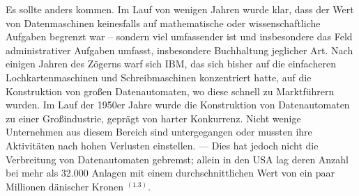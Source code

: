 {Es sollte anders kommen. Im Lauf von wenigen Jahren wurde klar, dass der Wert von Datenmaschinen keinesfalls auf mathematische oder wissenschaftliche Aufgaben begrenzt war -- sondern viel umfassender ist und insbesondere das Feld administrativer Aufgaben umfasst, insbesondere Buchhaltung jeglicher Art. Nach einigen Jahren des Zögerns warf sich IBM, das sich bisher auf die einfacheren Lochkartenmaschinen und Schreibmaschinen konzentriert hatte, auf die Konstruktion von großen Datenautomaten, wo diese schnell zu Marktführern wurden. Im Lauf der 1950er Jahre wurde die Konstruktion von Datenautomaten zu einer Großindustrie, geprägt von harter Konkurrenz. Nicht wenige Unternehmen aus diesem Bereich sind untergegangen oder mussten ihre Aktivitäten nach hohen Verlusten einstellen. — Dies hat jedoch nicht die Verbreitung von Datenautomaten gebremst; allein in den USA lag deren Anzahl bei mehr als 32.000 Anlagen mit einem durchschnittlichen Wert von ein paar Millionen dänischer Kronen $^{(1.3)}$.
}




